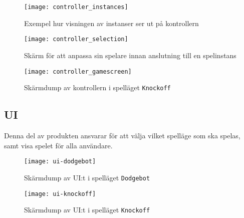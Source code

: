 \begin{figure}[h]
    \centering
    \texttt{[image: controller\_instances]}
    \caption{Exempel hur visningen av instanser ser ut på kontrollern}
    \label{fig:controller_instances}
\end{figure}

\begin{figure}[h]
    \centering
    \texttt{[image: controller\_selection]}
    \caption{Skärm för att anpassa sin spelare innan anslutning till en spelinstans}
    \label{fig:controller_selection}
\end{figure}

\begin{figure}[h]
    \centering
    \texttt{[image: controller\_gamescreen]}
    \caption{Skärmdump av kontrollern i spelläget \texttt{Knockoff}}
    \label{fig:controller_gamescreen}
\end{figure}

\subsection{UI}
Denna del av produkten ansvarar för att välja vilket spelläge som ska spelas, samt visa spelet för alla användare. 


\begin{figure}[h]
    \centering
    \texttt{[image: ui-dodgebot]}
    \caption{Skärmdump av UI:t i spelläget \texttt{Dodgebot}}
    \label{fig:ui-dodgebot}
\end{figure}

\begin{figure}[h]
    \centering
    \texttt{[image: ui-knockoff]}
    \caption{Skärmdump av UI:t i spelläget \texttt{Knockoff}}
    \label{fig:ui-knockoff}
\end{figure}